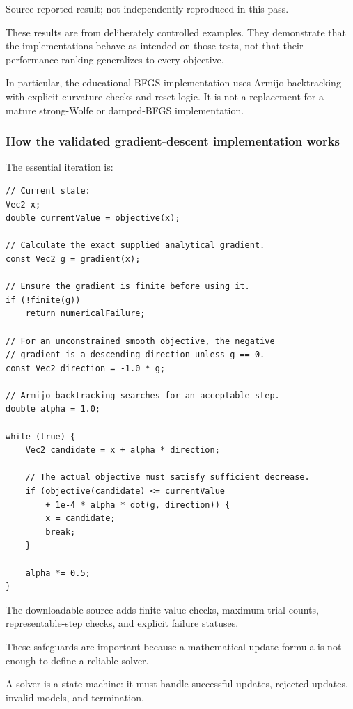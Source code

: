 Source-reported result; not independently reproduced in this pass.

These results are from deliberately controlled examples. They demonstrate that the implementations behave as intended on those tests, not that their performance ranking generalizes to every objective.

In particular, the educational BFGS implementation uses Armijo backtracking with explicit curvature checks and reset logic. It is not a replacement for a mature strong-Wolfe or damped-BFGS implementation.

\subsubsection{How the validated gradient-descent implementation works}\label{02-foundations-ii-ch028-how-the-validated-gradient-descent-implementation-works}

The essential iteration is:

\begin{verbatim}
// Current state:
Vec2 x;
double currentValue = objective(x);

// Calculate the exact supplied analytical gradient.
const Vec2 g = gradient(x);

// Ensure the gradient is finite before using it.
if (!finite(g))
    return numericalFailure;

// For an unconstrained smooth objective, the negative
// gradient is a descending direction unless g == 0.
const Vec2 direction = -1.0 * g;

// Armijo backtracking searches for an acceptable step.
double alpha = 1.0;

while (true) {
    Vec2 candidate = x + alpha * direction;

    // The actual objective must satisfy sufficient decrease.
    if (objective(candidate) <= currentValue
        + 1e-4 * alpha * dot(g, direction)) {
        x = candidate;
        break;
    }

    alpha *= 0.5;
}
\end{verbatim}

The downloadable source adds finite-value checks, maximum trial counts, representable-step checks, and explicit failure statuses.

These safeguards are important because a mathematical update formula is not enough to define a reliable solver.

A solver is a state machine: it must handle successful updates, rejected updates, invalid models, and termination.

